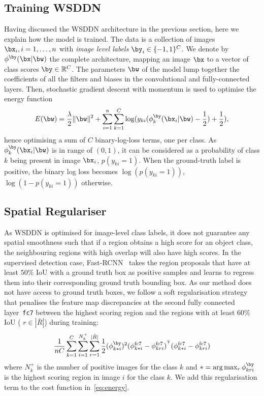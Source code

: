 \subsection{Training WSDDN}\label{s:training}

Having discussed the WSDDN architecture in the previous section, here we explain how the model is trained. The data is a collection of images $\bx_i, i=1,\dots, n$ with \emph{image level labels} $\by_i \in \{-1,1\}^C$. We denote by $\phi^{\by}(\bx|\bw)$ the complete architecture, mapping an image $\bx$ to a vector of class scores $\by\in\mathbb{R}^C$. The parameters $\bw$ of the model lump together the coefficients of all the filters and biases in the convolutional and fully-connected layers. Then, stochastic gradient descent with momentum is used to optimise the energy function
\begin{equation}
E(\bw)
=
\frac{\lambda}{2}\|\bw\|^2
+
\sum_{i=1}^n
\sum_{k=1}^C
\log(y_{ki} (\phi^{\by}_k(\bx_i|\bw)-\frac{1}{2}) + \frac{1}{2}),
\label{eq:energy}
\end{equation} hence optimising a sum of $C$ binary-log-loss terms, one per class. As $\phi^{\by}_k(\bx_i|\bw)$ is in range of $(0,1)$, it can be considered as a probability of class $k$ being present in image $\bx_i$, \ie $p(y_{ki}=1)$. When the ground-truth label is positive, the binary log loss becomes $\log(p(y_{ki}=1))$, $\log(1-p(y_{ki}=1))$ otherwise.

\subsection{Spatial Regulariser}
As WSDDN is optimised for image-level class labels, it does not guarantee any spatial smoothness such that if a region obtains a high score for an object class, the neighbouring regions with high overlap will also have high scores. In the supervised detection case, Fast-RCNN~\cite{Girshick15} takes the region proposals that have at least $50 \%$ IoU with a ground truth box as positive samples and learns to regress them into their corresponding ground truth bounding box. As our method does not have access to ground truth boxes, we follow a soft regularisation strategy that penalises the feature map discrepancies at the second fully connected layer~\texttt{fc7} between the highest scoring region and the regions with at least $60 \%$ IoU (\ie\; $r\in|\bar{R}|$) during training:
\[
\frac{1}{nC}
\sum_{k=1}^C
\sum_{i=1}^{N_{k}^+}
\sum_{r=1}^{|\bar{R}|}
\frac{1}{2}(\phi^{\by}_{k*i})^2(\phi^{\text{fc7}}_{k*i}-\phi^{\text{fc7}}_{kri})^{^\mathrm{T}}(\phi^{\text{fc7}}_{k*i}-\phi^{\text{fc7}}_{kri})
\] where $N_{k}^+$ is the number of positive images for the class $k$ and $*=\arg\max_r \phi^{\by}_{kri}$ is the highest scoring region in image $i$ for the class $k$. We add this regularisation term to the cost function in~\cref{eq:energy}. 
